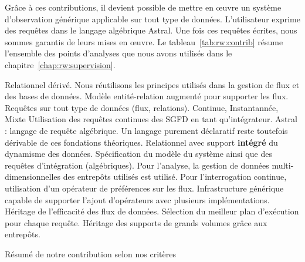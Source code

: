 Grâce à ces contributions, il devient possible de mettre en œuvre un système d'observation générique applicable sur tout type de données. L'utilisateur exprime des requêtes dans le langage algébrique Astral. Une fois ces requêtes écrites, nous sommes garantis de leurs mises en œuvre. Le tableau~\ref{tab:rw:contrib} résume l'ensemble des points d'analyses que nous avons utilisés dans le chapitre~\ref{chap:rw:supervision}.
\begin{table}[!ht]
\criteretabDonnee
    {Relationnel dérivé. Nous réutilisons les principes utilisés dans la gestion de flux et des bases de données.}
    {\good Modèle entité-relation augmenté pour supporter les flux.}
    {\good Requêtes sur tout type de données (flux, relations).}
\criteretabTraitement
    {\good Continue, Instantannée, Mixte}
    {\good Utilisation des requêtes continues des SGFD en tant qu'intégrateur.}
    {\meh Astral : langage de requête algébrique. Un langage purement déclaratif reste toutefois dérivable de ces fondations théoriques.}
    {\good Relationnel avec support \textbf{intégré} du dynamisme des données.}
\criteretabAdaptabilite
    {\good Spécification du modèle du système ainsi que des requêtes d'intégration (algébriques).}
    {\meh Pour l'analyse, la gestion de données multi-dimensionnelles des entrepôts utilisés est utilisé. Pour l'interrogation continue, utilisation d'un opérateur de préférences sur les flux.}
    {\good Infrastructure générique capable de supporter l'ajout d'opérateurs avec plusieurs implémentations.}
    {\good Héritage de l'efficacité des flux de données. Sélection du meilleur plan d'exécution pour chaque requête. Héritage des supports de grands volumes grâce aux entrepôts.}
\caption{Résumé de notre contribution selon nos critères}\label{tab:rw:contrib}
\end{table}